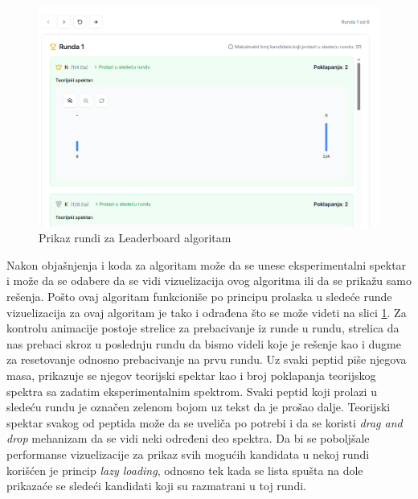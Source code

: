 \documentclass[12pt,oneside]{memoir}
\begin{document}
\begin{figure}[h]
\centering
\includegraphics[width=1\textwidth,height=0.4\textheight]{images/leaderboard_2.png}
\caption{Prikaz rundi za Leaderboard algoritam}
\label{fig:leaderboard_2}
\end{figure}

Nakon objašnjenja i koda za algoritam može da se unese eksperimentalni spektar i može da se odabere da se vidi vizuelizacija ovog algoritma ili da se prikažu samo rešenja. Pošto ovaj algoritam funkcioniše po principu prolaska u sledeće runde vizuelizacija za ovaj algoritam je tako i odrađena što se može videti na slici \ref{fig:leaderboard_2}. Za kontrolu animacije postoje strelice za prebacivanje iz runde u rundu, strelica da nas prebaci skroz u poslednju rundu da bismo videli koje je rešenje kao i dugme za resetovanje odnosno prebacivanje na prvu rundu. Uz svaki peptid piše njegova masa, prikazuje se njegov teorijski spektar kao i broj poklapanja teorijskog spektra sa zadatim eksperimentalnim spektrom. Svaki peptid koji prolazi u sledeću rundu je označen zelenom bojom uz tekst da je prošao dalje.
Teorijski spektar svakog od peptida može da se uveliča po potrebi i da se koristi \emph{drag and drop} mehanizam da se vidi neki određeni deo spektra.
Da bi se poboljšale performanse vizuelizacije za prikaz svih mogućih kandidata u nekoj rundi korišćen je princip \emph{lazy loading}, odnosno tek kada se lista spušta na dole prikazaće se sledeći kandidati koji su razmatrani u toj rundi.
\end{document}

